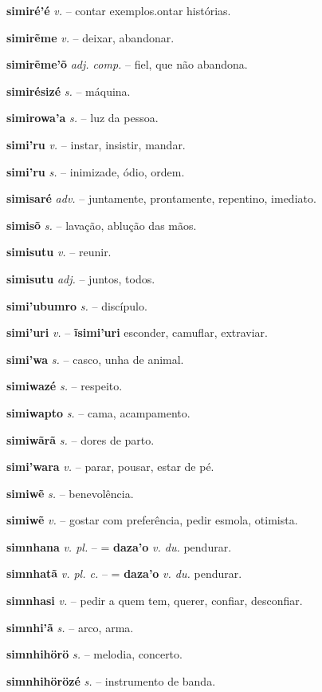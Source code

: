 \textbf{simiré'é} \textit{v.} -- contar exemplos.ontar histórias.

\textbf{simirẽme} \textit{v.} -- deixar, abandonar.

\textbf{simirẽme'õ} \textit{adj. comp.} -- fiel, que não abandona.

\textbf{simirésizé} \textit{s.} -- máquina.

\textbf{simirowa'a} \textit{s.} -- luz da pessoa.

\textbf{simi'ru} \textit{v.} -- instar, insistir, mandar.

\textbf{simi'ru} \textit{s.} -- inimizade, ódio, ordem.

\textbf{simisaré} \textit{adv.} -- juntamente, prontamente, repentino, imediato.

\textbf{simisõ} \textit{s.} -- lavação, ablução das mãos.

\textbf{simisutu} \textit{v.} -- reunir.

\textbf{simisutu} \textit{adj.} -- juntos, todos.

\textbf{simi'ubumro} \textit{s.} -- discípulo.

\textbf{simi'uri} \textit{v.} -- \textbf{ĩsimi'uri} esconder, camuflar, extraviar.

\textbf{simi'wa} \textit{s.} -- casco, unha de animal.

\textbf{simiwazé} \textit{s.} -- respeito.

\textbf{simiwapto} \textit{s.} -- cama, acampamento.

\textbf{simiwãrã} \textit{s.} -- dores de parto.

\textbf{simi'wara} \textit{v.} -- parar, pousar, estar de pé.

\textbf{simiwẽ} \textit{s.} -- benevolência.

\textbf{simiwẽ} \textit{v.} -- gostar com preferência, pedir esmola, otimista.

\textbf{simnhana} \textit{v. pl.} -- = \textbf{daza'o} \textit{v. du.} pendurar.

\textbf{simnhatã} \textit{v. pl. c.} -- = \textbf{daza'o} \textit{v. du.} pendurar.

\textbf{simnhasi} \textit{v.} -- pedir a quem tem, querer, confiar, desconfiar.

\textbf{simnhi'ã} \textit{s.} -- arco, arma.

\textbf{simnhihörö} \textit{s.} -- melodia, concerto.

\textbf{simnhihörözé} \textit{s.} -- instrumento de banda.

